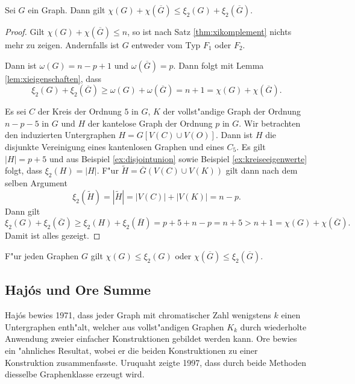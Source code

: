 \begin{theorem}
  Sei $G$ ein Graph. Dann gilt $\chi(G) + \chi(\overline{G}) \leq \xi_{2}(G) +  \xi_{2}(\overline{G})$.
  \label{thm:xichromatisch}
\end{theorem}
\begin{proof}
  Gilt $\chi(G) + \chi(\overline{G}) \leq n$, so ist nach Satz \ref{thm:xikomplement} nichts mehr zu zeigen. Andernfalls ist $G$ entweder vom Typ $F_1$ oder $F_2$. 

   Dann ist $\omega(G) = n-p+1$ und $\omega (\overline{G})=p$. Dann folgt mit Lemma \ref{lem:xieigenschaften}, dass 
  $$\xi_{2}(G) + \xi_{2}(\overline{G}) \geq \omega(G) + \omega(\overline{G}) = n+ 1 = \chi(G) + \chi(\overline{G}).$$

   Es sei $C$ der Kreis der Ordnung $5$ in $G$, $K$ der vollst"andige Graph der Ordnung $n-p-5$ in $G$ und $H$ der kantelose Graph der Ordnung $p$ in $G$. Wir betrachten den induzierten Untergraphen $H=G[V(C) \cup V(O)]$. Dann ist $H$ die disjunkte Vereinigung eines kantenlosen Graphen und eines $C_5$. Es gilt $|H| = p+5$ und aus Beispiel \ref{ex:disjointunion} sowie Beispiel \ref{ex:kreiseeigenwerte} folgt, dass $\xi_{2}(H) = |H|$. 
  F"ur $\tilde{H} = \overline{G} (V(C) \cup V(K))$ gilt dann nach dem selben Argument $$\xi_{2}(\tilde{H}) = |\tilde{H}| = |V(C)| + |V(K)| = n-p .$$ Dann gilt 
  $$\xi_{2}(G) + \xi_{2}(\overline{G}) \geq \xi_{2}(H) + \xi_{2}(\overline{H}) = p+5 + n -p = n+ 5 > n+ 1 = \chi(G) + \chi(\overline{G}).$$
  Damit ist alles gezeigt.
\end{proof}

\begin{corollary}
  F"ur jeden Graphen $G$ gilt $\chi(G) \leq \xi_{2}(G)$ oder $\chi(\overline G) \leq \xi_{2}(\overline{G})$.
\end{corollary}

\subsection{Haj\'os und Ore Summe}
Haj\'os \cite{Hajos61} bewies 1971, dass jeder Graph mit chromatischer Zahl wenigstens $k$ einen Untergraphen enth"alt, welcher aus vollst"andigen Graphen $K_k$ durch wiederholte Anwendung zweier einfacher Konstruktionen gebildet werden kann. 
Ore \cite{Ore67} bewies ein "ahnliches Resultat, wobei er die beiden Konstruktionen zu einer Konstruktion zusammenfasste. Uruquaht \cite{Urquhart97} zeigte 1997, dass durch beide Methoden diesselbe Graphenklasse erzeugt wird. 

